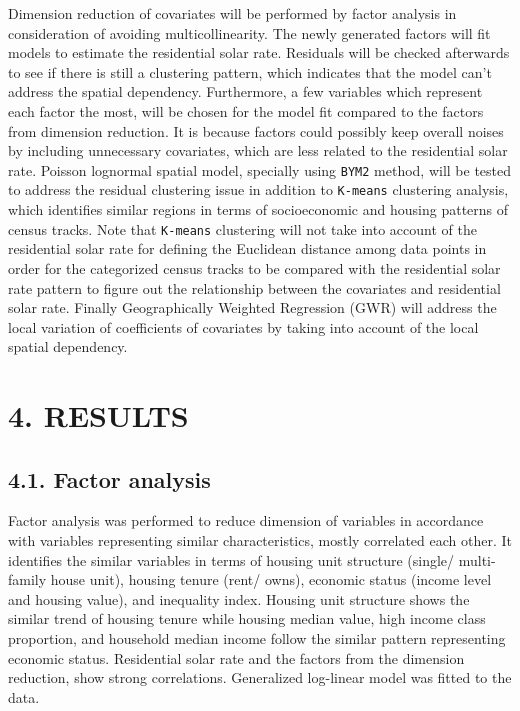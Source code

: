 \documentclass[11pt,]{article}
\begin{document}
Dimension reduction of covariates will be performed by factor analysis
in consideration of avoiding multicollinearity. The newly generated
factors will fit models to estimate the residential solar rate.
Residuals will be checked afterwards to see if there is still a
clustering pattern, which indicates that the model can't address the
spatial dependency. Furthermore, a few variables which represent each
factor the most, will be chosen for the model fit compared to the
factors from dimension reduction. It is because factors could possibly
keep overall noises by including unnecessary covariates, which are less
related to the residential solar rate. Poisson lognormal spatial model,
specially using \texttt{BYM2} method, will be tested to address the
residual clustering issue in addition to \texttt{K-means} clustering
analysis, which identifies similar regions in terms of socioeconomic and
housing patterns of census tracks. Note that \texttt{K-means} clustering
will not take into account of the residential solar rate for defining
the Euclidean distance among data points in order for the categorized
census tracks to be compared with the residential solar rate pattern to
figure out the relationship between the covariates and residential solar
rate. Finally Geographically Weighted Regression (GWR) will address the
local variation of coefficients of covariates by taking into account of
the local spatial dependency.

\hypertarget{results}{%
\section{4. RESULTS}\label{results}}

\hypertarget{factor-analysis}{%
\subsection{4.1. Factor analysis}\label{factor-analysis}}

Factor analysis was performed to reduce dimension of variables in
accordance with variables representing similar characteristics, mostly
correlated each other. It identifies the similar variables in terms of
housing unit structure (single/ multi-family house unit), housing tenure
(rent/ owns), economic status (income level and housing value), and
inequality index. Housing unit structure shows the similar trend of
housing tenure while housing median value, high income class proportion,
and household median income follow the similar pattern representing
economic status. Residential solar rate and the factors from the
dimension reduction, show strong correlations. Generalized log-linear
model was fitted to the data.
\end{document}
